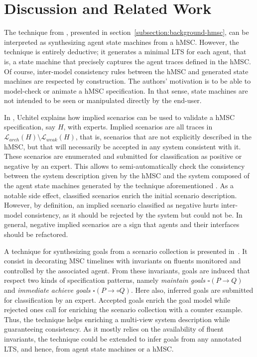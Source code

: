 \chapter{Discussion and Related Work\label{chapter:discussion}}

The technique from \cite{Uchitel:2003}, presented in section~\ref{subsection:background-hmsc}, can be interpreted as synthesizing agent state machines from a hMSC. However, the technique is entirely deductive; it generates a minimal LTS for each agent, that is, a state machine that precisely captures the agent traces defined in the hMSC. Of course, inter-model consistency rules between the hMSC and generated state machines are respected by construction.  The authors' motivation is to be able to model-check or animate a hMSC specification. In that sense, state machines are not intended to be seen or manipulated directly by the end-user.

In \cite{Uchitel:2004}, Uchitel explains how implied scenarios can be used to validate a hMSC specification, say $H$, with experts. Implied scenarios are all traces in $\mathcal{L}_{arch}(H) \setminus \mathcal{L}_{weak}(H)$, that is, scenarios that are not explicitly described in the hMSC, but that will necessarily be accepted in any system consistent with it. These scenarios are enumerated and submitted for classification as positive or negative by an expert. This allows to semi-automatically check the consistency between the system description given by the hMSC and the system composed of the agent state machines generated by the technique aforementioned \cite{Uchitel:2003}. As a notable side effect, classified scenarios enrich the initial scenario description. However, by definition, an implied scenario classified as negative hurts inter-model consistency, as it should be rejected by the system but could not be. In general, negative implied scenarios are a sign that agents and their interfaces should be refactored. 

A technique for synthesizing goals from a scenario collection is presented in~\cite{Damas:2006}. It consist in decorating MSC timelines with invariants on fluents monitored and controlled by the associated agent. From these invariants, goals are induced that respect two kinds of specification patterns, namely \emph{maintain goals} $\square(P \rightarrow Q)$ and \emph{immediate achieve goals} $\square(P \rightarrow \circ Q)$. Here also, inferred goals are submitted for classification by an expert. Accepted goals enrich the goal model while rejected ones call for enriching the scenario collection with a counter example. Thus, the technique helps enriching a multi-view system description while guaranteeing consistency. As it mostly relies on the availability of fluent invariants, the technique could be extended to infer goals from any annotated LTS, and hence, from agent state machines or a hMSC. 

